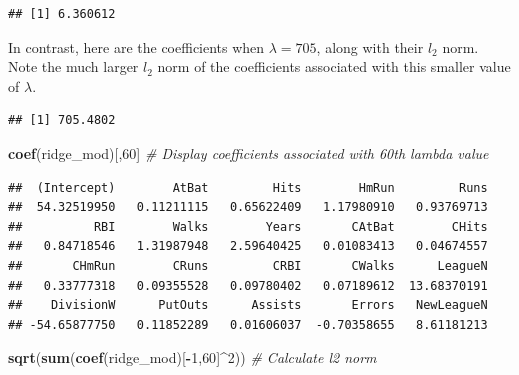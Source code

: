 \documentclass[openany]{book}
\newenvironment{Shaded}{\begin{snugshade}}{\end{snugshade}}
\newcommand{\CommentTok}[1]{\textcolor[rgb]{0.56,0.35,0.01}{\textit{#1}}}
\newcommand{\DecValTok}[1]{\textcolor[rgb]{0.00,0.00,0.81}{#1}}
\newcommand{\KeywordTok}[1]{\textcolor[rgb]{0.13,0.29,0.53}{\textbf{#1}}}
\newcommand{\NormalTok}[1]{#1}
\newcommand{\OperatorTok}[1]{\textcolor[rgb]{0.81,0.36,0.00}{\textbf{#1}}}
\begin{document}
\begin{verbatim}
## [1] 6.360612
\end{verbatim}

In contrast, here are the coefficients when \(\lambda = 705\), along with their \(l_2\)
norm. Note the much larger \(l_2\) norm of the coefficients associated with this
smaller value of \(\lambda\).

\begin{Shaded}
\end{Shaded}

\begin{verbatim}
## [1] 705.4802
\end{verbatim}

\begin{Shaded}
\begin{Highlighting}[]
\KeywordTok{coef}\NormalTok{(ridge_mod)[,}\DecValTok{60}\NormalTok{] }\CommentTok{# Display coefficients associated with 60th lambda value}
\end{Highlighting}
\end{Shaded}

\begin{verbatim}
##  (Intercept)        AtBat         Hits        HmRun         Runs 
##  54.32519950   0.11211115   0.65622409   1.17980910   0.93769713 
##          RBI        Walks        Years       CAtBat        CHits 
##   0.84718546   1.31987948   2.59640425   0.01083413   0.04674557 
##       CHmRun        CRuns         CRBI       CWalks      LeagueN 
##   0.33777318   0.09355528   0.09780402   0.07189612  13.68370191 
##    DivisionW      PutOuts      Assists       Errors   NewLeagueN 
## -54.65877750   0.11852289   0.01606037  -0.70358655   8.61181213
\end{verbatim}

\begin{Shaded}
\begin{Highlighting}[]
\KeywordTok{sqrt}\NormalTok{(}\KeywordTok{sum}\NormalTok{(}\KeywordTok{coef}\NormalTok{(ridge_mod)[}\OperatorTok{-}\DecValTok{1}\NormalTok{,}\DecValTok{60}\NormalTok{]}\OperatorTok{^}\DecValTok{2}\NormalTok{)) }\CommentTok{# Calculate l2 norm}
\end{Highlighting}
\end{Shaded}
\end{document}
